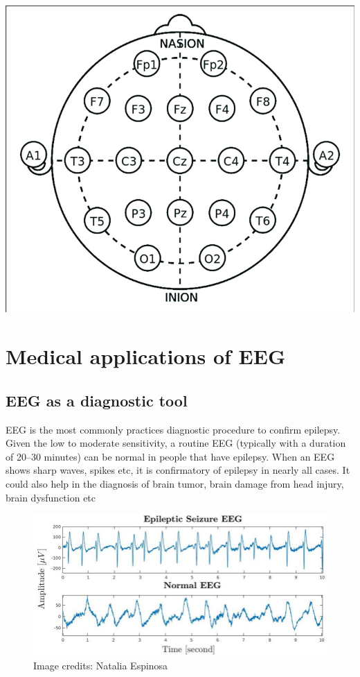 \documentclass[
  letterpaper,
  DIV=11,
  numbers=noendperiod]{scrreprt}
\begin{document}
\includegraphics{images/The-10-20-International-system-of-EEG-electrode-placement.png}

\chapter{Medical applications of EEG}\label{medical-applications-of-eeg}

\section{EEG as a diagnostic tool}\label{eeg-as-a-diagnostic-tool}

EEG is the most commonly practices diagnostic procedure to confirm
epilepsy. Given the low to moderate sensitivity, a routine EEG
(typically with a duration of 20--30 minutes) can be normal in people
that have epilepsy. When an EEG shows sharp waves, spikes etc, it is
confirmatory of epilepsy in nearly all cases. It could also help in the
diagnosis of brain tumor, brain damage from head injury, brain
dysfunction etc

\begin{figure}[H]

{\centering \includegraphics{images/Epileptic-Seizure-EEG-vs-Normal-EEG.jpg}

}

\caption{Image credits: Natalia Espinosa}

\end{figure}%
\end{document}

